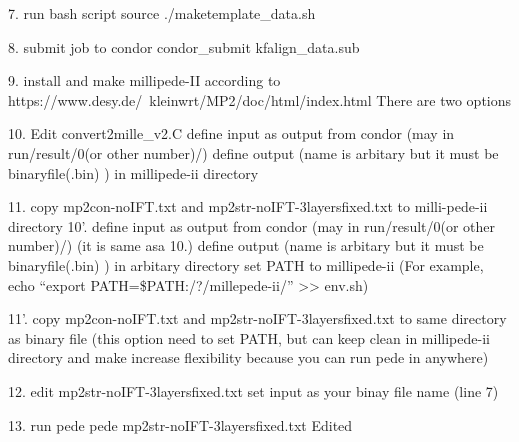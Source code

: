 7. run bash script
source ./maketemplate_data.sh

8. submit job to condor
condor_submit kfalign_data.sub  

9. install and make millipede-II according to https://www.desy.de/~kleinwrt/MP2/doc/html/index.html
There are two options

10. Edit convert2mille_v2.C
define input as output from condor (may in run/result/0(or other number)/) 
define output (name is arbitary but it must be binaryfile(.bin) ) in millipede-ii directory 

11. copy mp2con-noIFT.txt and mp2str-noIFT-3layersfixed.txt to milli-pede-ii directory
10’.
define input as output from condor (may in run/result/0(or other number)/) (it is same asa 10.)
define output (name is arbitary but it must be binaryfile(.bin) ) in  arbitary directory
set PATH to millipede-ii
(For example, echo “export PATH=\$PATH:/?/millepede-ii/” >> env.sh)

11’. copy mp2con-noIFT.txt and mp2str-noIFT-3layersfixed.txt to same directory as binary file
(this option need to set PATH, but can keep clean in millipede-ii directory and make increase flexibility because you can run pede in anywhere)

12. edit mp2str-noIFT-3layersfixed.txt
set input as your binay file name (line 7)

13. run pede
pede mp2str-noIFT-3layersfixed.txt Edited

